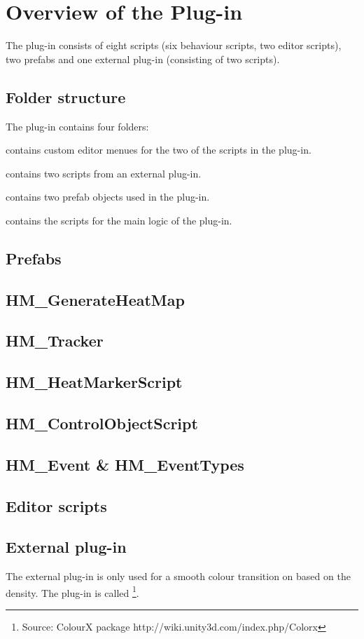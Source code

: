 \section{Overview of the Plug-in}
\label{CO}
The plug-in consists of eight scripts (six behaviour scripts, two editor scripts), two prefabs and one external plug-in (consisting of two scripts). 

\subsection{Folder structure}
\label{CO_FStructure}
The plug-in contains four folders:
\begin{my_enumerate}
\item [\textit{Editor}] contains custom editor menues for the two of the scripts in the plug-in.
\item [\textit{Plugins}] contains two scripts from an external plug-in.
\item [\textit{Prefabs}] contains two prefab objects used in the plug-in.
\item [\textit{Scripts}] contains the scripts for the main logic of the plug-in.
\end{my_enumerate}

\subsection{Prefabs}
\label{CO_Prefabs}

\subsection{HM\_GenerateHeatMap}
\label{CO_GHM}

\subsection{HM\_Tracker}
\label{CO_Tracker}

\subsection{HM\_HeatMarkerScript}
\label{CO_HMS}

\subsection{HM\_ControlObjectScript}
\label{CO_COS}

\subsection{HM\_Event & HM\_EventTypes}
\label{CO_Event}

\subsection{Editor scripts}
\label{CO_Editor}

\subsection{External plug-in}
\label{CO_PlugIn}
The external plug-in is only used for a smooth colour transition on based on the density. The plug-in is called \footnote{Source: ColourX package http://wiki.unity3d.com/index.php/Colorx}.
